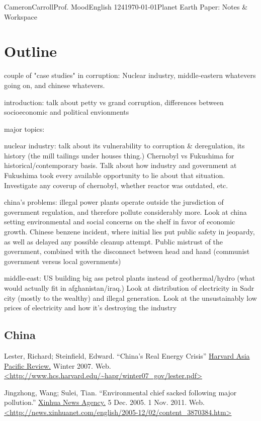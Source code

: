 \documentclass[12pt,letterpaper]{article}
\begin{document}
\begin{mla}{Cameron}{Carroll}{Prof. Mood}{English 124}{\today}{Planet Earth Paper: Notes \& Workspace}
\section{Outline}
couple of "case studies" in corruption: Nuclear industry, middle-eastern whatevers going on, and chinese whatevers.

introduction: talk about petty vs grand corruption, differences between socioeconomic and political envionments



major topics:

nuclear industry: talk about its vulnerability to corruption \& deregulation, its history (the mill tailings under houses thing.) Chernobyl vs Fukushima for historical/contemporary basis. Talk about how industry and government at Fukushima took every available opportunity to lie about that situation. Investigate any coverup of chernobyl, whether reactor was outdated, etc.

china's problems: illegal power plants operate outside the jursdiction of government regulation, and therefore pollute considerably more. Look at china setting environmental and social concerns on the shelf in favor of economic growth.
Chinese benzene incident, where initial lies put public safety in jeopardy, as well as delayed any possible cleanup attempt. Public mistrust of the government, combined with the disconnect between head and hand (communist government versus local governments)

middle-east: US building big ass petrol plants instead of geothermal/hydro (what would actually fit in afghanistan/iraq.) Look at distribution of electricity in Sadr city (mostly to the wealthy) and illegal generation. Look at the unsustainably low prices of electricity and how it's destroying the industry




\begin{workscited}

\section*{\small{China}}

\bibent
Lester, Richard; Steinfield, Edward. ``China's Real Energy Crisis'' \underline{Harvard Asia Pacific Review.} Winter 2007. Web. \url{<http://www.hcs.harvard.edu/~hapr/winter07_gov/lester.pdf>}

\bibent
Jingzhong, Wang; Sulei, Tian. ``Environmental chief sacked following major pollution.'' \underline{Xinhua News Agency.} 5 Dec. 2005. 1 Nov. 2011. Web. \url{<http://news.xinhuanet.com/english/2005-12/02/content_3870384.htm>} 


\end{workscited}
\end{mla}
\end{document}

